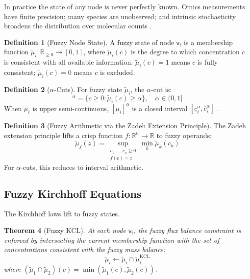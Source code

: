 \documentclass[10pt,twocolumn,a4paper]{article}
\theoremstyle{plain}
\newtheorem{theorem}{Theorem}[section]
\theoremstyle{definition}
\newtheorem{definition}[theorem]{Definition}
\theoremstyle{remark}
\newcommand{\fnode}{\mathsf{v}}
\newcommand{\R}{\mathbb{R}}
\begin{document}
In practice the state of any node is never perfectly known. Omics measurements have finite precision; many species are unobserved; and intrinsic stochasticity broadens the distribution over molecular counts \citep{elowitz2002}.

\begin{definition}[Fuzzy Node State]
\label{def:fuzzy_state}
A fuzzy state of node $\fnode_i$ is a membership function $\widetilde{\mu}_i: \R_{\geq 0} \to [0,1]$, where $\widetilde{\mu}_i(c)$ is the degree to which concentration $c$ is consistent with all available information. $\widetilde{\mu}_i(c) = 1$ means $c$ is fully consistent; $\widetilde{\mu}_i(c) = 0$ means $c$ is excluded.
\end{definition}

\begin{definition}[$\alpha$-Cuts]
\label{def:alpha_cut}
For fuzzy state $\widetilde{\mu}_i$, the $\alpha$-cut is:
\begin{equation}
    [\widetilde{\mu}_i]^\alpha = \{c \geq 0 : \widetilde{\mu}_i(c) \geq \alpha\}, \quad \alpha \in (0, 1]
\end{equation}
When $\widetilde{\mu}_i$ is upper semi-continuous, $[\widetilde{\mu}_i]^\alpha$ is a closed interval $[\underline{c}_i^\alpha, \overline{c}_i^\alpha]$ \citep{zadeh1965}.
\end{definition}

\begin{definition}[Fuzzy Arithmetic via the Zadeh Extension Principle]
\label{def:extension}
The Zadeh extension principle \citep{zadeh1965} lifts a crisp function $f: \R^n \to \R$ to fuzzy operands:
\begin{equation}
    \widetilde{\mu}_f(z) = \sup_{\substack{c_1, \ldots, c_n \geq 0 \\ f(\mathbf{c}) = z}} \min_k \widetilde{\mu}_k(c_k)
\end{equation}
For $\alpha$-cuts, this reduces to interval arithmetic.
\end{definition}

\subsection{Fuzzy Kirchhoff Equations}

The Kirchhoff laws lift to fuzzy states.

\begin{theorem}[Fuzzy KCL]
\label{thm:fuzzy_kcl}
At each node $\fnode_i$, the fuzzy flux balance constraint is enforced by intersecting the current membership function with the set of concentrations consistent with the fuzzy mass balance:
\begin{equation}
    \widetilde{\mu}_i \leftarrow \widetilde{\mu}_i \cap \widetilde{\mu}_i^{\mathrm{KCL}}
    \label{eq:fuzzy_kcl}
\end{equation}
where $(\widetilde{\mu}_1 \cap \widetilde{\mu}_2)(c) = \min(\widetilde{\mu}_1(c), \widetilde{\mu}_2(c))$.
\end{theorem}
\end{document}

